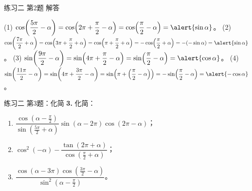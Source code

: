 \documentclass[10pt,aspectratio=169,serif]{beamer}
\begin{document}
\begin{frame}[t]{练习二 第2题 解答}
\begin{tcolorbox}[colback=orange!10,colframe=orange,title=\textbf{证明}]
(1) $\cos\!\left(\dfrac{5\pi}{2}-\alpha\right)=\cos\!\left(2\pi+\dfrac{\pi}{2}-\alpha\right)=\cos\!\left(\dfrac{\pi}{2}-\alpha\right)=\alert{\sin\alpha}$。
\vspace{0.3em}
(2) $\cos\!\left(\dfrac{7\pi}{2}+\alpha\right)=\cos\!\left(3\pi+\dfrac{\pi}{2}+\alpha\right)=\cos\!\left(\pi+\dfrac{\pi}{2}+\alpha\right)=-\cos\!\left(\dfrac{\pi}{2}+\alpha\right)=-(-\sin\alpha)=\alert{\sin\alpha}$。
\vspace{0.3em}
(3) $\sin\!\left(\dfrac{9\pi}{2}-\alpha\right)=\sin\!\left(4\pi+\dfrac{\pi}{2}-\alpha\right)=\sin\!\left(\dfrac{\pi}{2}-\alpha\right)=\alert{\cos\alpha}$。
\vspace{0.3em}
(4) $\sin\!\left(\dfrac{11\pi}{2}-\alpha\right)=\sin\!\left(4\pi+\dfrac{3\pi}{2}-\alpha\right)=\sin\!\left(\pi+\left(\dfrac{\pi}{2}-\alpha\right)\right)=-\sin\!\left(\dfrac{\pi}{2}-\alpha\right)=\alert{-\cos\alpha}$。
\end{tcolorbox}
\end{frame}

\begin{frame}[t]{练习二 第3题：化简}
\textbf{3.} 化简：
\begin{enumerate}[(1)]
  \item $\dfrac{\cos\!\left(\alpha-\frac{\pi}{2}\right)}{\sin\!\left(\frac{5\pi}{2}+\alpha\right)}\sin(\alpha-2\pi)\cos(2\pi-\alpha)$；
  \item $\cos^2(-\alpha)-\dfrac{\tan(2\pi+\alpha)}{\cos\!\left(\frac{\pi}{2}+\alpha\right)}$；
  \item $\dfrac{\cos(\alpha-3\pi)\cos\!\left(\frac{3\pi}{2}-\alpha\right)}{\sin^2\!\left(\alpha-\frac{\pi}{2}\right)}$。
\end{enumerate}
\end{frame}
\end{document}
